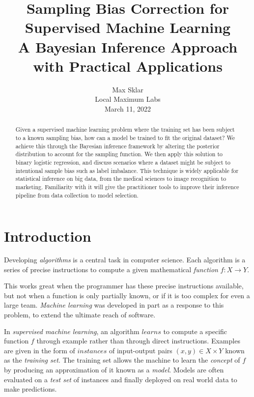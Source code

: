\documentclass[twoside]{article}
\begin{document}
\parindent=0in
\parskip=12pt

\title{
  Sampling Bias Correction for Supervised Machine Learning \\
  \large{
    A Bayesian Inference Approach with Practical Applications
  }
}

\author{Max Sklar\\ Local Maximum Labs \\ March 11, 2022}
\date{}

\maketitle
\thispagestyle{empty}

\begin{abstract}
Given a supervised machine learning problem where the training set has been subject to a known sampling bias, how can a model be trained to fit the original dataset? We achieve this through the Bayesian inference framework by altering the posterior distribution to account for the sampling function. We then apply this solution to binary logistic regression, and discuss scenarios where a dataset might be subject to intentional sample bias such as label imbalance. This technique is widely applicable for statistical inference on big data, from the medical sciences to image recognition to marketing. Familiarity with it will give the practitioner tools to improve their inference pipeline from data collection to model selection. 
\end{abstract}

\section{Introduction}
\label{section:introduction}

Developing \textit{algorithms} is a central task in computer science. Each algorithm is a series of precise instructions to compute a given mathematical \textit{function} \(f: X \to Y\).

This works great when the programmer has these precise instructions available, but not when a function is only partially known, or if it is too complex for even a large team. \textit{Machine learning} was developed in part as a response to this problem, to extend the ultimate reach of software. 

In \textit{supervised machine learning}, an algorithm \(learns\) to compute a specific function \(f\) through example rather than through direct instructions. Examples are given in the form of \(instances\) of input-output pairs \((x, y) \in X \times Y\) known as the \textit{training set}. The training set allows the machine to learn the \textit{concept} of \(f\) by producing an approximation of it known as a \textit{model}. Models are often evaluated on a \textit{test set} of instances and finally deployed on real world data to make predictions.
\end{document}
